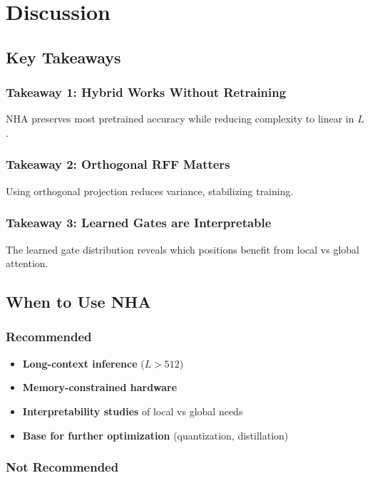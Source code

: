 
\section{Discussion}

\subsection{Key Takeaways}

\subsubsection{Takeaway 1: Hybrid Works Without Retraining}

NHA preserves most pretrained accuracy while reducing complexity to linear 
in $L$.

\subsubsection{Takeaway 2: Orthogonal RFF Matters}

Using orthogonal projection reduces variance, stabilizing training.

\subsubsection{Takeaway 3: Learned Gates are Interpretable}

The learned gate distribution reveals which positions benefit from local vs 
global attention.

\subsection{When to Use NHA}

\subsubsection{Recommended}

\begin{itemize}
\item \textbf{Long-context inference} ($L > 512$)
\item \textbf{Memory-constrained hardware}
\item \textbf{Interpretability studies} of local vs global needs
\item \textbf{Base for further optimization} (quantization, distillation)

\end{itemize}
\subsubsection{Not Recommended}

